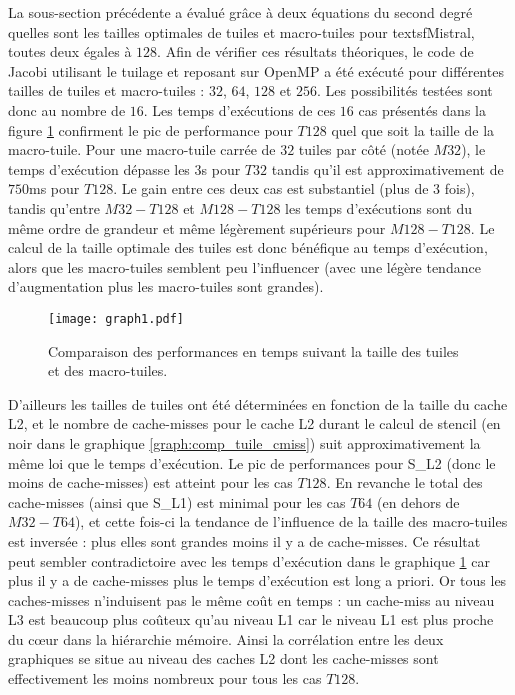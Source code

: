 La sous-section précédente a évalué grâce à deux équations du second degré quelles sont les tailles optimales de tuiles et macro-tuiles pour textsf{Mistral}, toutes deux égales à $128$. Afin de vérifier ces résultats théoriques, le code de Jacobi utilisant le tuilage et reposant sur \textsf{OpenMP} a été exécuté pour différentes tailles de tuiles et macro-tuiles : $32$, $64$, $128$ et $256$. Les possibilités testées sont donc au nombre de $16$. Les temps d'exécutions de ces $16$ cas présentés dans la figure \ref{graph:comp_tuile_time} confirment le pic de performance pour $T128$ quel que soit la taille de la macro-tuile. Pour une macro-tuile carrée de $32$ tuiles par côté (notée $M32$), le temps d'exécution dépasse les $3$s pour $T32$ tandis qu'il est approximativement de $750$ms pour $T128$. Le gain entre ces deux cas est substantiel (plus de $3$ fois), tandis qu'entre $M32-T128$ et $M128-T128$ les temps d'exécutions sont du même ordre de grandeur et même légèrement supérieurs pour $M128-T128$. Le calcul de la taille optimale des tuiles est donc bénéfique au temps d'exécution, alors que les macro-tuiles semblent peu l'influencer (avec une légère tendance d'augmentation plus les macro-tuiles sont grandes).

\begin{figure}[!h]
  \caption{Comparaison des performances en temps suivant la taille des tuiles et des macro-tuiles.}
  \label{graph:comp_tuile_time}
  \texttt{[image: graph1.pdf]}
\end{figure}

D'ailleurs les tailles de tuiles ont été déterminées en fonction de la taille du cache L2, et le nombre de cache-misses pour le cache L2 durant le calcul de stencil (en noir dans le graphique \ref{graph:comp_tuile_cmiss}) suit approximativement la même loi que le temps d'exécution. Le pic de performances pour S\_L2 (donc le moins de cache-misses) est atteint pour les cas $T128$. En revanche le total des cache-misses (ainsi que S\_L1) est minimal pour les cas $T64$ (en dehors de $M32-T64$), et cette fois-ci la tendance de l'influence de la taille des macro-tuiles est inversée : plus elles sont grandes moins il y a de cache-misses. Ce résultat peut sembler contradictoire avec les temps d'exécution dans le graphique \ref{graph:comp_tuile_time} car plus il y a de cache-misses plus le temps d'exécution est long a priori. Or tous les caches-misses n'induisent pas le même coût en temps : un cache-miss au niveau L3 est beaucoup plus coûteux qu'au niveau L1 car le niveau L1 est plus proche du cœur dans la hiérarchie mémoire. Ainsi la corrélation entre les deux graphiques se situe au niveau des caches L2 dont les cache-misses sont effectivement les moins nombreux pour tous les cas $T128$. 

